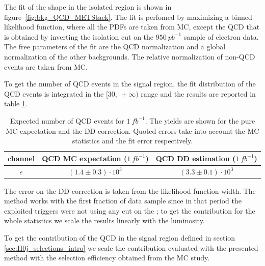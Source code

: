 The fit of the \MET shape in the isolated region is shown in figure~\ref{fig:bkg_QCD_METStack}.
The fit is perfomed by maximizing a binned likelihood function, where all the PDFs are taken 
from MC, except the QCD that is obtained by inverting the isolation cut on the $950\ pb^{-1}$ 
sample of electron data. The free parameters of the fit are the QCD normalization and a global
normalization of the other backgrounds. The relative normalization of non-QCD events are taken
from MC.

To get the number of QCD events in the signal region, the fit distribution of the QCD events is integrated
in the $[30,\ +\infty)$ \MET range and the results are reported in table \ref{tab:bkg_QCD_DDYields}.

\begin{table}[htb]
  \begin{center}
  \begin{tabular}{c|c|c}
  \hline
         channel  & QCD MC expectation ($1\ fb^{-1}$) & QCD DD estimation ($1\ fb^{-1}$) \\
  \hline
  $e$    & \scriptsize{$(1.4\pm0.3)\cdot10^3$} & \scriptsize{$(3.3\pm0.1)\cdot10^3$}  \\
  \hline
  \end{tabular}
  \end{center}
  \caption{Expected number of QCD events for $1\ fb^{-1}$. The yields are shown for the pure
           MC expectation and the DD correction. Quoted errors take into account the MC statistics
           and the fit error respectively.}
  \label{tab:bkg_QCD_DDYields}
\end{table}
  
The error on the DD correction is taken from the likelihood function width. The method works with the first fraction of 
data sample since in that period the exploited triggers were not using any cut on the \MET; to get 
the contribution for the whole statistics we scale the results linearly with the luminosity.

To get the contribution of the QCD in the signal region defined in section \ref{sec:H0j_selections_intro} 
we scale the contribution evaluated with the presented method with the selection efficiency obtained
from the MC study.

